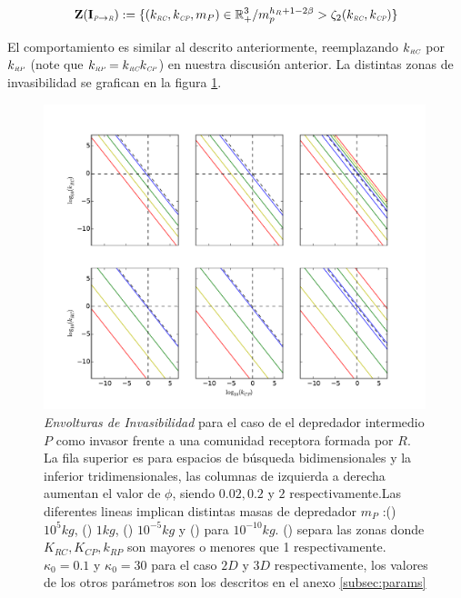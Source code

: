 \begin{equation}
\mathbf{Z(I_{\textit{\tiny P} \to \textit{\tiny R}})} := \{ (k_{\textit{\tiny RC}},k_{\textit{\tiny CP}},m_P) \in \mathbb{R}^3_+ / m_p^{h_R + 1 - 2\beta} > \zeta_2(k_{\textit{\tiny RC}},k_{\textit{\tiny CP}}) \}
\end{equation}

El comportamiento es similar al descrito anteriormente, reemplazando $k_{\textit{\tiny RC}}$ por $k_{\textit{\tiny RP}}$ (note que $k_{\textit{\tiny RP}} = k_{\textit{\tiny RC}} k_{\textit{\tiny CP}}$) en nuestra discusi\'on anterior. La distintas zonas de invasibilidad se grafican en la figura \ref{fig:Z(IC3)}.


\begin{figure}[!htbp]
  \centering
  \includegraphics[width = 0.99\textwidth]{./Plots/Z(IC3)AcGrGr.pdf}
  \caption[Env $Z(IC3)$]{\emph{Envolturas de Invasibilidad} para el caso de el depredador intermedio $P$ como invasor frente a una comunidad receptora formada por $R$. La fila superior es para espacios de b\'usqueda bidimensionales y la inferior tridimensionales, las columnas de izquierda a derecha aumentan el valor de $\phi$, siendo $0.02,0.2$ y $2$ respectivamente.Las diferentes lineas implican distintas masas de depredador $m_P$ :({\hwplotR}) $10^5 kg$,  ({\hwplotY}) $1kg$, ({\hwplotG}) $10^{-5}kg$ y ({\hwplotB}) para $10^{-10}kg$. ({\hwplotK}) separa las zonas donde $K_{RC},K_{CP},k_{RP}$ son mayores o menores que 1 respectivamente. $\kappa_0 = 0.1$ y $\kappa_0 = 30$ para el caso $2D$ y $3D$ respectivamente, los valores de los otros par\'ametros son los descritos en el anexo \ref{subsec:params}}
  \label{fig:Z(IC3)}
\end{figure}

